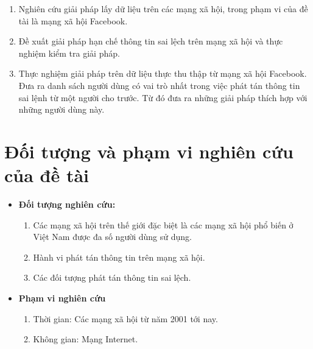 \begin {itemize}
\begin {enumerate} [+]
			\item Nghiên cứu giải pháp lấy dữ liệu trên các mạng xã hội, trong phạm vi của đề tài là mạng xã hội Facebook.
			\item Đề xuất giải pháp hạn chế thông tin sai lệch trên mạng xã hội và thực nghiệm kiểm tra giải pháp.
			\item Thực nghiệm giải pháp trên dữ liệu thực thu thập từ mạng xã hội Facebook. Đưa ra danh sách người dùng có vai trò nhất trong việc phát tán thông tin sai lệnh từ một người cho trước. Từ đó đưa ra những giải pháp thích hợp với những người dùng này.
		\end {enumerate}
\end {itemize}

\tocless\section {Đối tượng và phạm vi nghiên cứu của đề tài}
\begin {itemize}
	\item {\bfseries Đối tượng nghiên cứu:}
		\begin{enumerate} [+]
			\item Các mạng xã hội trên thế giới đặc biệt là các mạng xã hội phổ biến ở Việt Nam được đa số người dùng sử dụng.
			\item Hành vi phát tán thông tin trên mạng xã hội.
			\item Các đối tượng phát tán thông tin sai lệch.
		\end{enumerate}
	\item {\bfseries Phạm vi nghiên cứu}
		\begin {enumerate} [+]
			\item Thời gian: Các mạng xã hội từ năm 2001 tới nay.
			\item Không gian: Mạng Internet.
		\end {enumerate}
\end {itemize}

